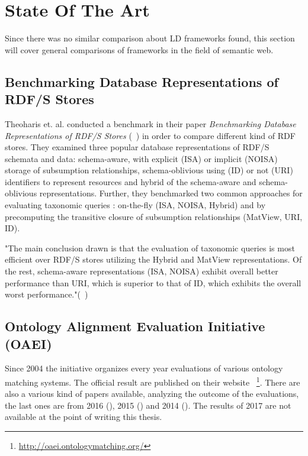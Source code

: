 \chapter{State Of The Art}

Since there was no similar comparison about LD frameworks found, this section will 
cover general comparisons of frameworks in the field of semantic web.

\section{Benchmarking Database Representations of RDF/S Stores}

Theoharis et. al. conducted a benchmark in their paper \emph{Benchmarking Database 
Representations of RDF/S Stores} (~\cite{theoharis2005benchmarking}) in order to 
compare different kind of RDF stores. They examined three popular database 
representations of RDF/S schemata and data: schema-aware, with explicit (ISA) or 
implicit (NOISA) storage of subsumption relationships, schema-oblivious using (ID) 
or not (URI) identifiers to represent resources and hybrid of the schema-aware and 
schema-oblivious representations. Further, they benchmarked two common approaches 
for evaluating taxonomic queries : on-the-fly (ISA, NOISA, Hybrid) and by 
precomputing the transitive closure of subsumption relationships (MatView, URI, 
ID). 

"The main conclusion drawn is that the evaluation of taxonomic queries is most 
efficient over RDF/S stores utilizing the Hybrid and MatView representations. Of 
the rest, schema-aware representations (ISA, NOISA) exhibit overall better 
performance than URI, which is superior to that of ID, which exhibits the overall 
worst performance."(~\cite{theoharis2005benchmarking})

\section{Ontology Alignment Evaluation Initiative (OAEI)}

Since 2004 the initiative organizes every year evaluations of various ontology 
matching systems. The official result are published on their website~
\footnote{\url{http://oaei.ontologymatching.org/}}. There are also a various kind 
of papers available, analyzing the outcome of the evaluations, the last ones are 
from 2016 (\cite{achichi2016results}), 2015 (\cite{cheatham2015results}) and 2014 
(\cite{dragisic2014results}). The results of 2017 are not available at the point 
of writing this thesis.

